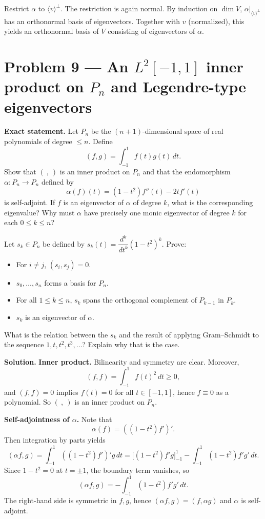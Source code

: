\documentclass[12pt,a4paper]{article}
\theoremstyle{plain}
\theoremstyle{definition}      %
\begin{document}
Restrict $\alpha$ to $\langle v\rangle^\perp$. The restriction is again normal.
By induction on $\dim V$, $\alpha|_{\langle v\rangle^\perp}$ has an orthonormal basis of eigenvectors.
Together with $v$ (normalized), this yields an orthonormal basis of $V$ consisting of eigenvectors of $\alpha$.


\section{Problem 9 — An $L^2[-1,1]$ inner product on $P_n$ and Legendre-type eigenvectors}

\textbf{Exact statement.}
Let $P_n$ be the $(n+1)$-dimensional space of real polynomials of degree $\le n$. Define
\[
(f,g)=\int_{-1}^{1} f(t)g(t)\,dt.
\]
Show that $(\ ,\ )$ is an inner product on $P_n$ and that the endomorphism $\alpha:P_n\to P_n$ defined by
\[
\alpha(f)(t)=(1-t^2)f''(t)-2t f'(t)
\]
is self-adjoint.
If $f$ is an eigenvector of $\alpha$ of degree $k$, what is the corresponding eigenvalue?
Why must $\alpha$ have precisely one monic eigenvector of degree $k$ for each $0\le k\le n$?

Let $s_k\in P_n$ be defined by $s_k(t)=\dfrac{d^k}{dt^k}(1-t^2)^k$. Prove:
\begin{itemize}
	\item[(i)] For $i\ne j$, $(s_i,s_j)=0$.
	\item[(ii)] $s_0,\dots,s_n$ forms a basis for $P_n$.
	\item[(iii)] For all $1\le k\le n$, $s_k$ spans the orthogonal complement of $P_{k-1}$ in $P_k$.
	\item[(iv)] $s_k$ is an eigenvector of $\alpha$.
\end{itemize}
What is the relation between the $s_k$ and the result of applying Gram--Schmidt to the sequence $1,t,t^2,t^3,\dots$?
Explain why that is the case.

\textbf{Solution.}
\textbf{Inner product.}
Bilinearity and symmetry are clear. Moreover,
\[
(f,f)=\int_{-1}^{1} f(t)^2\,dt\ge 0,
\]
and $(f,f)=0$ implies $f(t)=0$ for all $t\in[-1,1]$, hence $f\equiv 0$ as a polynomial.
So $(\ ,\ )$ is an inner product on $P_n$.

\textbf{Self-adjointness of $\alpha$.}
Note that
\[
\alpha(f)=((1-t^2)f')'.
\]
Then integration by parts yields
\[
(\alpha f,g)=\int_{-1}^{1} ((1-t^2)f')'g\,dt
=\Big[(1-t^2)f'g\Big]_{-1}^{1}-\int_{-1}^{1}(1-t^2)f'g'\,dt.
\]
Since $1-t^2=0$ at $t=\pm 1$, the boundary term vanishes, so
\[
(\alpha f,g)=-\int_{-1}^{1}(1-t^2)f'g'\,dt.
\]
The right-hand side is symmetric in $f,g$, hence $(\alpha f,g)=(f,\alpha g)$ and $\alpha$ is self-adjoint.
\end{document}
